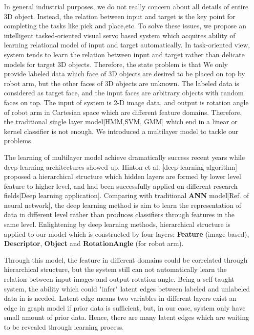 \documentclass[journal]{IEEEtran}
\begin{document}
In general industrial purposes, we do not really concern about all details of entire 3D object. Instead, the relation between input and target is the key point for completing the tasks like pick and place,etc. To solve these issues, we propose an intelligent tasked-oriented visual servo based system which acquires ability of learning relational model of input and target automatically. In task-oriented view, system tends to learn the relation between input and target rather than delicate models for target 3D objects. Therefore, the state problem is that We only provide labeled data which face of 3D objects are desired to be placed on top by robot arm, but the other faces of 3D objects are unknown. The labeled data is considered as target face, and the input faces are arbitrary objects with random faces on top. The input of system is 2-D image data, and output is rotation angle of robot arm in Cartesian space which are different feature domains. Therefore, the traditional single layer model[HMM,SVM, GMM] which end in a linear or kernel classifier is not enough. We introduced a multilayer model to tackle our problems. 

The learning of multilayer model achieve dramatically success recent years while deep learning architectures showed up. Hinton et al. [deep learning algorithm] proposed a hierarchical structure which hidden layers are formed by lower level feature to higher level, and had been successfully applied on different research fields[Deep learning application]. Comparing with traditional \textbf{ANN} model[Ref. of neural network], the deep learning method is aim to learn the representation of data in different level rather than produces classifiers through features in the same level. Enlightening by deep learning methods, hierarchical structure is applied to our model which is constructed by four layers: \textbf{Feature} (image based), \textbf{Descriptor}, \textbf{Object} and \textbf{RotationAngle} (for robot arm).

Through this model, the feature in different domains could be correlated through hierarchical structure, but the system still can not automatically learn the relation between input images and output rotation angle. Being a self-taught system, the ability which could "infer" latent edges between labeled and unlabeled data in is needed. Latent edge means two variables in different layers exist an edge in graph model if prior data is sufficient, but, in our case, system only have small amount of prior data. Hence, there are many latent edges which are waiting to be revealed through learning process. 
\end{document}
